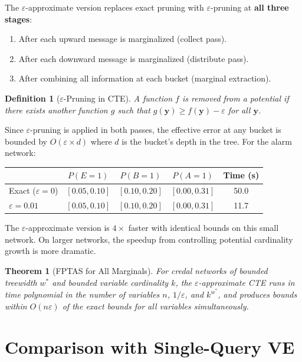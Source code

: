 \documentclass[11pt]{article}
\newtheorem{definition}{Definition}
\newtheorem{theorem}{Theorem}
\begin{document}
The $\varepsilon$-approximate version replaces exact pruning with $\varepsilon$-pruning
at \textbf{all three stages}:
\begin{enumerate}
  \item After each upward message is marginalized (collect pass).
  \item After each downward message is marginalized (distribute pass).
  \item After combining all information at each bucket (marginal extraction).
\end{enumerate}

\begin{definition}[$\varepsilon$-Pruning in CTE]
A function $f$ is removed from a potential if there exists another function $g$ such
that $g(\mathbf{y}) \geq f(\mathbf{y}) - \varepsilon$ for all $\mathbf{y}$.
\end{definition}

Since $\varepsilon$-pruning is applied in both passes, the effective error at any bucket
is bounded by $O(\varepsilon \times d)$ where $d$ is the bucket's depth in the tree.
For the alarm network:

\begin{center}
\begin{tabular}{lcccc}
\toprule
& $P(E{=}1)$ & $P(B{=}1)$ & $P(A{=}1)$ & Time (s) \\
\midrule
Exact ($\varepsilon{=}0$) & $[0.05, 0.10]$ & $[0.10, 0.20]$ & $[0.00, 0.31]$ & 50.0 \\
$\varepsilon{=}0.01$ & $[0.05, 0.10]$ & $[0.10, 0.20]$ & $[0.00, 0.31]$ & 11.7 \\
\bottomrule
\end{tabular}
\end{center}

The $\varepsilon$-approximate version is $4\times$ faster with identical bounds on this
small network. On larger networks, the speedup from controlling potential cardinality
growth is more dramatic.

\begin{theorem}[FPTAS for All Marginals]
For credal networks of bounded treewidth $w^*$ and bounded variable cardinality $k$,
the $\varepsilon$-approximate CTE runs in time polynomial in the number of variables
$n$, $1/\varepsilon$, and $k^{w^*}$, and produces bounds within $O(n\varepsilon)$ of
the exact bounds for all variables simultaneously.
\end{theorem}

\section{Comparison with Single-Query VE}
\end{document}
